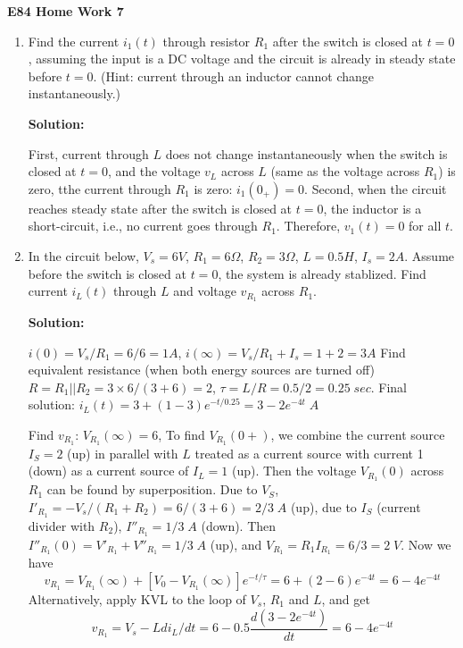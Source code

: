 \usepackage{html}

\begin{center}
{\Large \bf E84 Home Work 7}
\end{center}
\begin{enumerate}

\item Find the current $i_1(t)$ through resistor $R_1$ after the
  switch is closed at $t=0$, assuming the input is a DC voltage and 
  the circuit is already in steady state before $t=0$.
  (Hint: current through an inductor cannot change instantaneously.)


  {\bf Solution:}
 
  First, current through $L$ does not change instantaneously when the 
  switch is closed at $t=0$, and the voltage $v_L$ across $L$ (same as
  the voltage across $R_1$) is zero, tthe current through $R_1$ is zero:
  $i_1(0_+)=0$. Second, when the circuit reaches steady state after the 
  switch is closed at $t=0$, the inductor is a short-circuit, i.e., no 
  current goes through $R_1$. Therefore, $v_1(t)=0$ for all $t$.

\item In the circuit below, $V_s=6V$, $R_1=6\Omega$, $R_2=3\Omega$,
  $L=0.5H$, $I_s=2A$. Assume before the switch is closed at $t=0$, the
  system is already stablized. Find current $i_L(t)$ through $L$ and 
  voltage $v_{R_1}$ across $R_1$.

 
  {\bf Solution:}
 
  $i(0)=V_s/R_1=6/6=1A$, $i(\infty)=V_s/R_1+I_s=1+2=3A$
  Find equivalent resistance (when both energy sources are turned off)
  $R=R_1 || R_2=3\times 6/(3+6)=2$, $\tau=L/R=0.5/2=0.25\;sec.$
  Final solution:
  $i_L(t)=3+(1-3)e^{-t/0.25}=3-2 e^{-4t} \; A$
  
  Find $v_{R_1}$: 
  $V_{R_1}(\infty)=6$, To find $V_{R_1}(0+)$, we combine the current source
  $I_S=2$ (up) in parallel with $L$ treated as a current source with 
  current 1 (down) as a current source of $I_L=1$ (up). Then the voltage 
  $V_{R_1}(0)$ across $R_1$ can be found by superposition. Due to $V_S$,
  $I'_{R_1}=-V_s/(R_1+R_2)=6/(3+6)=2/3\;A$ (up), due to $I_S$ (current
  divider with $R_2$), $I''_{R_1}=1/3\;A$ (down). Then 
  $I''_{R_1}(0)=V'_{R_1}+V''_{R_1}=1/3\;A$ (up), and $V_{R_1}=R_1I_{R_1}=6/3=2\;V$.
  Now we have
  \[ v_{R_1}=V_{R_1}(\infty)+[V_0-V_{R_1}(\infty)]e^{-t/\tau}=6+(2-6)e^{-4t}
  =6-4e^{-4t}	\]
  Alternatively, apply KVL to the loop of $V_s$, $R_1$ and $L$, and get
  \[ v_{R_1}=V_s-L di_L/dt=6-0.5 \frac{d(3-2 e^{-4t})}{dt}=6-4e^{-4t}	\]
  

\end{enumerate}
